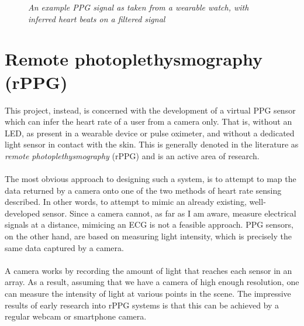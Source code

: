 \begin{figure}[H]
    \centering
    \subfloat{\scalebox{0.7}{}}
    \subfloat{\scalebox{0.7}{}}
   \caption{\textit{An example PPG signal as taken from a wearable watch, with inferred heart beats on a filtered signal} }
\end{figure}
\section{Remote photoplethysmography (rPPG)}
\label{ref:rPPG_prep}
This project, instead, is concerned with the development of a virtual PPG sensor which can infer the heart rate of a user from a camera only.
That is, without an LED, as present in a wearable device or pulse oximeter, and without a dedicated light sensor in contact with the skin. 
This is generally denoted in the literature as \textit{remote photoplethysmography} (rPPG) and is an active area of research.
\\\\
The most obvious approach to designing such a system, is to attempt to map the data returned by a camera onto one of the two methods of heart rate sensing described. In other words, to attempt 
to mimic an already existing, well-developed sensor.
Since a camera cannot, as far as I am aware, measure electrical signals at a distance, mimicing an ECG is not a feasible approach. PPG sensors, on the other hand, are based on measuring light intensity, which is precisely the same data captured by a camera.
\\\\
A camera works by recording the amount of light that reaches each sensor in an array. As a result, assuming that we have a camera of high enough resolution, one can measure the intensity of light 
at various points in the scene. The impressive results of early research into rPPG systems is that this can be achieved by a regular webcam or smartphone camera.
\\\\
